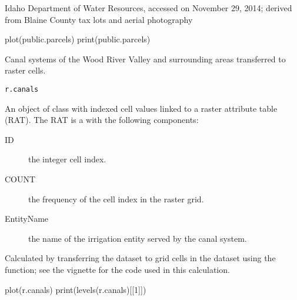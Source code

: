 \documentclass[a4paper]{book}
\begin{document}
%
\begin{Source}\relax
Idaho Department of Water Resources, accessed on November 29, 2014;
derived from Blaine County tax lots and aerial photography
\end{Source}
%
\begin{Examples}
\begin{ExampleCode}
plot(public.parcels)
print(public.parcels)
\end{ExampleCode}
\end{Examples}
%
\begin{Description}\relax
Canal systems of the Wood River Valley and surrounding areas transferred to raster cells.
\end{Description}
%
\begin{Usage}
\begin{verbatim}
r.canals
\end{verbatim}
\end{Usage}
%
\begin{Format}
An object of  class with indexed cell values linked to a raster attribute table (RAT).
The RAT is a  with the following components:
\begin{description}

\item[ID] the integer cell index.
\item[COUNT] the frequency of the cell index in the raster grid.
\item[EntityName] the name of the irrigation entity served by the canal system.

\end{description}

\end{Format}
%
\begin{Source}\relax
Calculated by transferring the  dataset to grid cells in the  dataset using the  function;
see the  vignette for the \R{} code used in this calculation.
\end{Source}
%
\begin{Examples}
\begin{ExampleCode}
plot(r.canals)
print(levels(r.canals)[[1]])
\end{ExampleCode}
\end{Examples}
\end{document}
